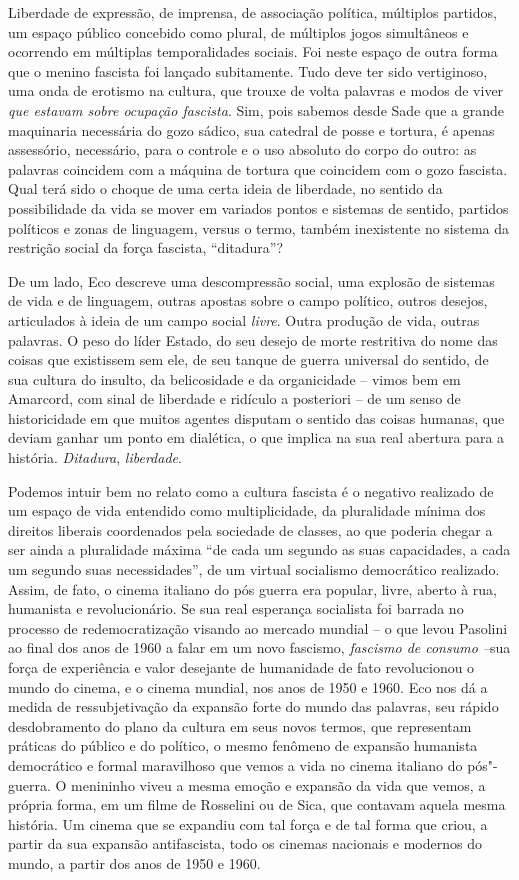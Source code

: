 Liberdade de expressão, de imprensa, de associação política, múltiplos
partidos, um espaço público concebido como plural, de múltiplos jogos
simultâneos e ocorrendo em múltiplas temporalidades sociais. Foi neste
espaço de outra forma que o menino fascista foi lançado subitamente.
Tudo deve ter sido vertiginoso, uma onda de erotismo na cultura, que
trouxe de volta palavras e modos de viver \emph{que estavam sobre
ocupação fascista}. Sim, pois sabemos desde Sade que a grande maquinaria
necessária do gozo sádico, sua catedral de posse e tortura, é apenas
assessório, necessário, para o controle e o uso absoluto do corpo do
outro: as palavras coincidem com a máquina de tortura que coincidem com
o gozo fascista. Qual terá sido o choque de uma certa ideia de
liberdade, no sentido da possibilidade da vida se mover em variados
pontos e sistemas de sentido, partidos políticos e zonas de linguagem,
versus o termo, também inexistente no sistema da restrição social da
força fascista, ``ditadura''?

De um lado, Eco descreve uma descompressão social, uma explosão de
sistemas de vida e de linguagem, outras apostas sobre o campo político,
outros desejos, articulados à ideia de um campo social \emph{livre}.
Outra produção de vida, outras palavras. O peso do líder Estado, do seu
desejo de morte restritiva do nome das coisas que existissem sem ele, de
seu tanque de guerra universal do sentido, de sua cultura do insulto, da
belicosidade e da organicidade -- vimos bem em Amarcord, com sinal de
liberdade e ridículo a posteriori -- de um senso de historicidade em que
muitos agentes disputam o sentido das coisas humanas, que deviam ganhar
um ponto em dialética, o que implica na sua real abertura para a
história. \emph{Ditadura}, \emph{liberdade}.

Podemos intuir bem no relato como a cultura fascista é o negativo
realizado de um espaço de vida entendido como multiplicidade, da
pluralidade mínima dos direitos liberais coordenados pela sociedade de
classes, ao que poderia chegar a ser ainda a pluralidade máxima ``de
cada um segundo as suas capacidades, a cada um segundo suas
necessidades'', de um virtual socialismo democrático realizado. Assim,
de fato, o cinema italiano do pós guerra era popular, livre, aberto à
rua, humanista e revolucionário. Se sua real esperança socialista foi
barrada no processo de redemocratização visando ao mercado mundial -- o
que levou Pasolini ao final dos anos de 1960 a falar em um novo
fascismo, \emph{fascismo de consumo --}sua força de experiência e valor
desejante de humanidade de fato revolucionou o mundo do cinema, e o
cinema mundial, nos anos de 1950 e 1960. Eco nos dá a medida de
ressubjetivação da expansão forte do mundo das palavras, seu rápido
desdobramento do plano da cultura em seus novos termos, que representam
práticas do público e do político, o mesmo fenômeno de expansão
humanista democrático e formal maravilhoso que vemos a vida no cinema
italiano do pós"-guerra. O menininho viveu a mesma emoção e expansão da
vida que vemos, a própria forma, em um filme de Rosselini ou de Sica,
que contavam aquela mesma história. Um cinema que se expandiu com tal
força e de tal forma que criou, a partir da sua expansão antifascista,
todo os cinemas nacionais e modernos do mundo, a partir dos anos de 1950
e 1960.

